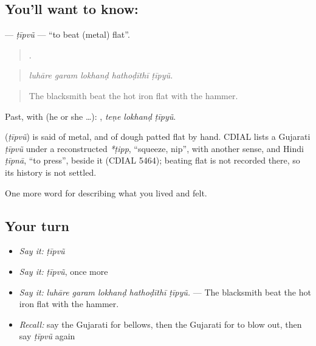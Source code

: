 \subsection*{You'll want to know: }
\textbf{} — \emph{ṭīpvũ} — \textquotedblleft{}to beat (metal) flat\textquotedblright{}.

\begin{quote}
    .
\end{quote}

\begin{quote}
\emph{luhāre garam lokhanḍ hathoḍīthī ṭīpyũ.}
\end{quote}

\begin{quote}
The blacksmith beat the hot iron flat with the hammer.
\end{quote}

Past, with  (he or she …):   , \emph{teṇe lokhanḍ ṭīpyũ}.

\begin{cousinweb}
\textbf{} (\emph{ṭīpvũ}) is said of metal, and of dough patted flat by hand. CDIAL lists a Gujarati \emph{ṭīpvũ} under a reconstructed \emph{*ṭipp}, \textquotedblleft{}squeeze, nip\textquotedblright{}, with another sense, and Hindi \emph{ṭīpnā}, \textquotedblleft{}to press\textquotedblright{}, beside it (CDIAL 5464); beating flat is not recorded there, so its history is not settled.
\end{cousinweb}

\begin{grammarlens}[title={What you've built}]
One more word for describing what you lived and felt.
\end{grammarlens}

\subsection*{Your turn}
\begin{itemize}
\raggedright
  \item \emph{Say it:} \emph{ṭīpvũ}
  \item \emph{Say it:} \emph{ṭīpvũ}, once more
  \item \emph{Say it:} \emph{luhāre garam lokhanḍ hathoḍīthī ṭīpyũ.} — The blacksmith beat the hot iron flat with the hammer.
  \item \emph{Recall:} say the Gujarati for bellows, then the Gujarati for to blow out, then say \emph{ṭīpvũ} again
\end{itemize}

